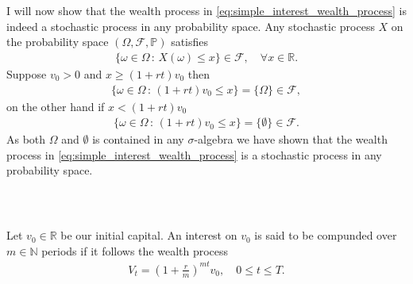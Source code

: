 \documentclass{beamer}
\numberwithin{equation}{section}
\begin{document}
\begin{frame}\frametitle{{\normalsize \secname} \\ {\large \subsecname}}
    I will now show that the wealth process in \eqref{eq:simple_interest_wealth_process} is indeed a stochastic process in any probability space.
    Any stochastic process $X$ on the probability space $(\Omega, \mathscr{F}, \mathbb{P})$ satisfies
    \begin{align}
        \{\omega \in \Omega \, : \, X(\omega) \leq x\} \in \mathscr{F}, \quad \forall x \in \mathbb{R}.
    \end{align}
    Suppose $v_0 > 0$ and $x \geq (1 + rt)v_0$ then
    \begin{align}
        \{\omega \in \Omega \, : \, (1 + rt)v_0 \leq x\} = \{\Omega\} \in \mathscr{F},
    \end{align}
    on the other hand if $x < (1 + rt)v_0$
    \begin{align}
        \{\omega \in \Omega \, : \, (1 + rt)v_0 \leq x\} = \{\emptyset\} \in \mathscr{F}.
    \end{align}
    As both $\Omega$ and $\emptyset$ is contained in any $\sigma$-algebra we have shown that the wealth process in \eqref{eq:simple_interest_wealth_process} is a stochastic process in any probability space.
\end{frame}

\begin{frame}\frametitle{{\normalsize \secname} \\ {\large \subsecname}}
    \begin{definition}
        Let $v_0 \in \mathbb{R}$ be our initial capital.
        An interest on $v_0$ is said to be compunded over $m\in\mathbb{N}$ periods if it follows the wealth process
        \begin{align}\label{eq:compund_interest_wealth_process}
            V_t = \left( 1 + \frac{r}{m} \right)^{mt} v_0, \quad 0 \leq t \leq T.
        \end{align}
    \end{definition}
\end{frame}
\end{document}
